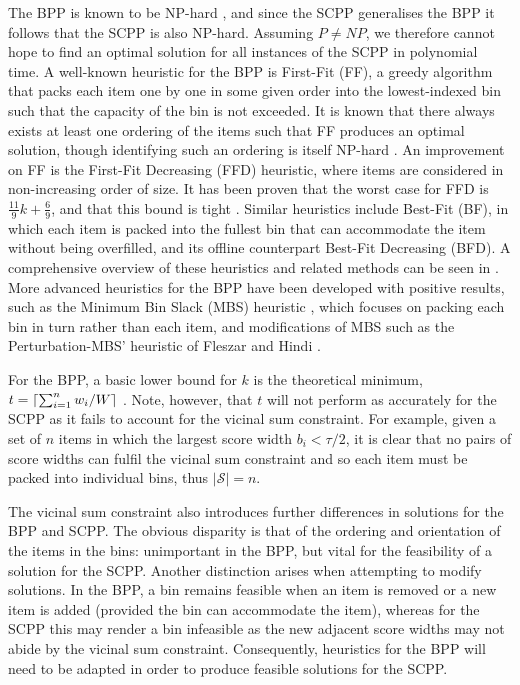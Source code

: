 \documentclass{IEEEtran}
\begin{document}
The BPP is known to be NP-hard \cite{garey1979}, and since the SCPP generalises the BPP it follows that the SCPP is also NP-hard. Assuming $P \neq NP$, we therefore cannot hope to find an optimal solution for all instances of the SCPP in polynomial time. A well-known heuristic for the BPP is First-Fit (FF), a greedy algorithm that packs each item one by one in some given order into the lowest-indexed bin such that the capacity of the bin is not exceeded. It is known that there always exists at least one ordering of the items such that FF produces an optimal solution, though identifying such an ordering is itself NP-hard  \cite{lewis2009}. An improvement on FF is the First-Fit Decreasing (FFD) heuristic, where items are considered in non-increasing order of size. It has been proven that the worst case for FFD is $\frac{11}{9}k + \frac{6}{9}$, and that this bound is tight \cite{dosa2007}. Similar heuristics include Best-Fit (BF), in which each item is packed into the fullest bin that can accommodate the item without being overfilled, and its offline counterpart Best-Fit Decreasing (BFD). A comprehensive overview of these heuristics and related methods can be seen in \cite{coffman1984}. More advanced heuristics for the BPP have been developed with positive results, such as the Minimum Bin Slack (MBS) heuristic \cite{gupta1999}, which focuses on packing each bin in turn rather than each item, and modifications of MBS such as the Perturbation-MBS' heuristic of Fleszar and Hindi \cite{fleszar2002}. 

For the BPP, a basic lower bound for $k$ is the theoretical minimum, $t = \ceil*{\sum_{i=1}^{n} w_i / W}$ \cite{martello1990l}. Note, however, that $t$ will not perform as accurately for the SCPP as it fails to account for the vicinal sum constraint. For example, given a set of $n$ items in which the largest score width $b_i < \tau / 2$, it is clear that no pairs of score widths can fulfil the vicinal sum constraint and so each item must be packed into individual bins, thus $|\mathcal{S}| = n$.

The vicinal sum constraint also introduces further differences in solutions for the BPP and SCPP. The obvious disparity is that of the ordering and orientation of the items in the bins: unimportant in the BPP, but vital for the feasibility of a solution for the SCPP. Another distinction arises when attempting to modify solutions. In the BPP, a bin remains feasible when an item is removed or a new item is added (provided the bin can accommodate the item), whereas for the SCPP this may render a bin infeasible as the new adjacent score widths may not abide by the vicinal sum constraint. Consequently, heuristics for the BPP will need to be adapted in order to produce feasible solutions for the SCPP.
\end{document}
